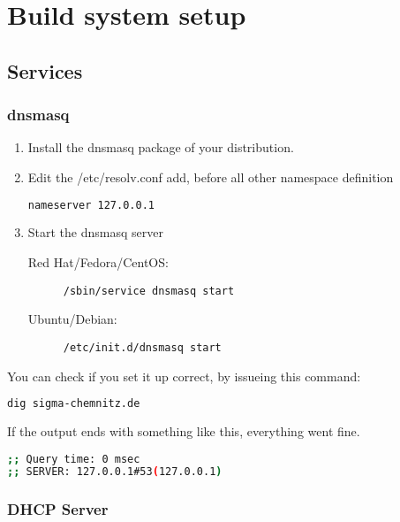\chapter{Build system setup}
\label{chap:setup}

\section{Services}
\label{sec:setup_services}

\subsection{dnsmasq}
\label{sec:setup_services_dnsmasq}

\begin{enumerate}
\item Install the dnsmasq package of your distribution.
\item Edit the /etc/resolv.conf add, before all other namespace definition
\begin{lstlisting}[language=sh]
nameserver 127.0.0.1
\end{lstlisting}
\item Start the dnsmasq server
  \begin{description}
  \item[Red Hat/Fedora/CentOS:] \lstinline[language=sh]{/sbin/service dnsmasq start}
  \item[Ubuntu/Debian:] \lstinline[language=sh]{/etc/init.d/dnsmasq start}
  \end{description}
\end{enumerate}

You can check if you set it up correct, by issueing this command:

\begin{lstlisting}[language=sh]
dig sigma-chemnitz.de
\end{lstlisting}


If the output ends with something like this, everything went fine.
\begin{lstlisting}[language=sh]
;; Query time: 0 msec
;; SERVER: 127.0.0.1#53(127.0.0.1)
\end{lstlisting}

\subsection{DHCP Server}
\label{sec:setup_services_dhcp-server}

